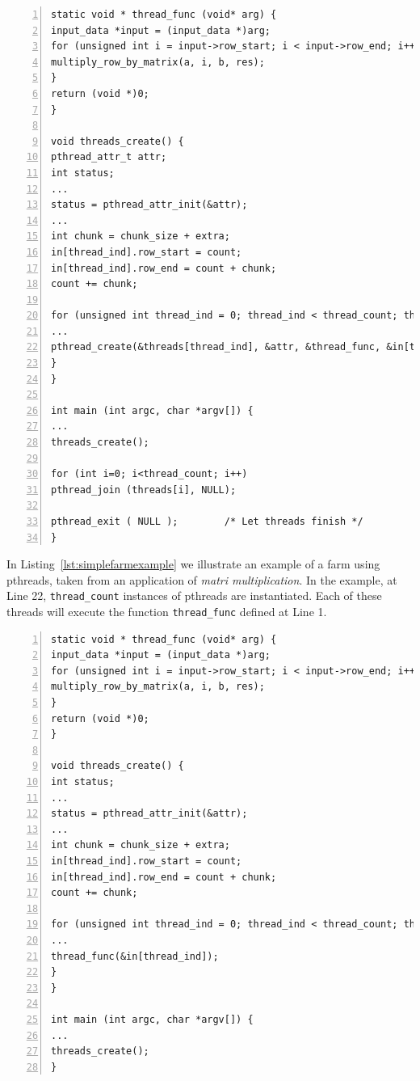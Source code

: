 \begin{lstlisting}[frame=single,numbers=left,label=lst:simplefarmexample,caption={Simple farm example, based on Matrix Multiplication}]
static void * thread_func (void* arg) {
input_data *input = (input_data *)arg;
for (unsigned int i = input->row_start; i < input->row_end; i++) {
multiply_row_by_matrix(a, i, b, res);
}
return (void *)0;
}

void threads_create() {
pthread_attr_t attr;
int status;
...
status = pthread_attr_init(&attr);
... 
int chunk = chunk_size + extra;
in[thread_ind].row_start = count;
in[thread_ind].row_end = count + chunk;
count += chunk;

for (unsigned int thread_ind = 0; thread_ind < thread_count; thread_ind++) {
...
pthread_create(&threads[thread_ind], &attr, &thread_func, &in[thread_ind]);
}
}

int main (int argc, char *argv[]) {
...
threads_create();

for (int i=0; i<thread_count; i++)
pthread_join (threads[i], NULL);

pthread_exit ( NULL );        /* Let threads finish */
}
\end{lstlisting}

\noindent
In Listing~\ref{lst:simplefarmexample} we illustrate an example of a farm using pthreads, taken from an application of \emph{matri multiplication}. In the example, at Line 22, \lstinline{thread_count} instances of pthreads are instantiated. Each of these threads will execute the function \lstinline{thread_func} defined at Line 1.  

\begin{lstlisting}[frame=single,numbers=left,label=lst:simplefarmremove,caption={Simple farm example, based on Matrix Multiplication, with pthreads eliminated.}]
static void * thread_func (void* arg) {
input_data *input = (input_data *)arg;
for (unsigned int i = input->row_start; i < input->row_end; i++) {
multiply_row_by_matrix(a, i, b, res);
}
return (void *)0;
}

void threads_create() {
int status;
...
status = pthread_attr_init(&attr);
... 
int chunk = chunk_size + extra;
in[thread_ind].row_start = count;
in[thread_ind].row_end = count + chunk;
count += chunk;

for (unsigned int thread_ind = 0; thread_ind < thread_count; thread_ind++) {
...
thread_func(&in[thread_ind]);
}
}

int main (int argc, char *argv[]) {
...
threads_create();
}
\end{lstlisting}

